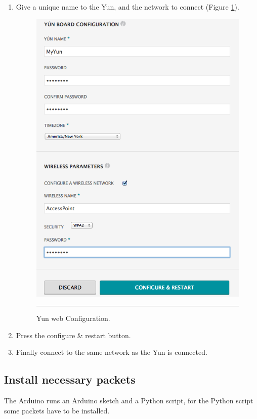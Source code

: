 \documentclass[12pt, a4paper,twoside]{tesi_upf}
\begin{document}
\begin{enumerate}
        \item Give a unique name to the Yun, and the network to connect (Figure \ref{fig:YunWebConfig}).
          \begin{figure}[htbp]
            \centering
                \includegraphics[scale=0.3]{./Figures/YunWebConfig.png}
                \\
                \rule{15em}{0.5pt}
            \caption[Yun web Configuration]{Yun web Configuration.}
            \label{fig:YunWebConfig}
          \end{figure}
          
        \item Press the configure \& restart button.
        \item Finally connect to the same network as the Yun is connected.
        
      \end{enumerate}
  \subsection{Install necessary packets}
    The Arduino runs an Arduino sketch and a Python script, for the Python script some packets have to be installed.
    
\end{document}
